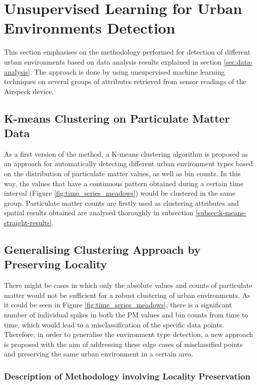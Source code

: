 \documentclass[bsc,frontabs,twoside,singlespacing, parskip,deptreport]{infthesis}     %
\begin{document}
\section{Unsupervised Learning for Urban Environments Detection}

This section emphasises on the methodology performed for detection of different urban environments based on data analysis results explained in section \ref{sec:data-analysis}. The approach is done by using unsupervised machine learning techniques on several groups of attributes retrieved from sensor readings of the Airspeck device.

\subsection{K-means Clustering on Particulate Matter Data}
\label{subsec:k-means-methodology}

As a first version of the method, a K-means clustering algorithm is proposed as an approach for automatically detecting different urban environment types based on the distribution of particulate matter values, as well as bin counts. In this way, the values that have a continuous pattern obtained during a certain time interval (Figure \ref{fig:time_series_meadows}) would be clustered in the same group. Particulate matter counts are firstly used as clustering attributes and spatial results obtained are analysed thoroughly in subsection \ref{subsec:k-means-straight-results}.

\subsection{Generalising Clustering Approach by Preserving Locality}
\label{subsec:generic-clustering}

There might be cases in which only the absolute values and counts of particulate matter would not be sufficient for a robust clustering of urban environments. As it could be seen in Figure \ref{fig:time_series_meadows}, there is a significant number of individual spikes in both the PM values and bin counts  from time to time, which would lead to a misclassification of the specific data points. Therefore, in order to generalise the environment type detection, a new approach is proposed with the aim of addressing these edge cases of misclassified points and preserving the same urban environment in a certain area. 

\subsubsection*{Description of Methodology involving Locality Preservation}
\end{document}
